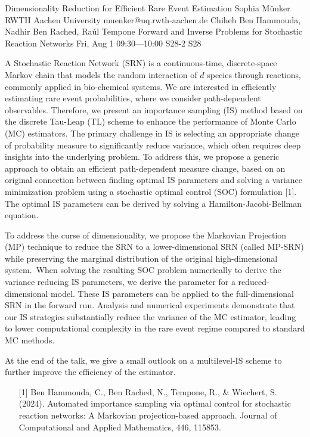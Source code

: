 \begin{talk}
  {Dimensionality Reduction for Efficient Rare Event Estimation}%
  {Sophia M\"unker}%
  {RWTH Aachen University}%
  {muenker@uq.rwth-aachen.de}%
  {Chiheb Ben Hammouda, Nadhir Ben Rached, Ra\'ul Tempone}%
  {Forward and Inverse Problems for Stochastic Reaction Networks}%
  {Fri, Aug 1 09:30---10:00}%
  {S28-2}%
  {S28}%
    
   
A Stochastic Reaction Network (SRN) is a continuous-time, discrete-space Markov chain that models the random interaction of $d$ species through reactions, commonly applied in bio-chemical systems. We are interested in efficiently estimating rare event probabilities, where we consider path-dependent observables. Therefore, we present an importance sampling (IS) method based on the discrete Tau-Leap (TL) scheme to enhance the performance of Monte Carlo (MC) estimators. The primary challenge in IS is selecting an appropriate change of probability measure to significantly reduce variance, which often requires deep insights into the underlying problem. To address this, we propose a generic approach to obtain an efficient path-dependent measure change, based on an original connection between finding optimal IS parameters and solving a variance minimization problem using a stochastic optimal control (SOC) formulation [1]. The optimal IS parameters can be derived by solving a Hamilton-Jacobi-Bellman equation.

To address the curse of dimensionality, we propose the Markovian Projection (MP) technique to reduce the SRN to a lower-dimensional SRN (called MP-SRN) while preserving the marginal distribution of the original high-dimensional system. When solving the resulting SOC problem numerically to derive the variance reducing IS parameters, we derive the parameter for a reduced-dimensional model. These IS parameters can be applied to the full-dimensional SRN in the forward run. Analysis and numerical experiments demonstrate that our IS strategies substantially reduce the variance of the MC estimator, leading to lower computational complexity in the rare event regime compared to standard MC methods. 

At the end of the talk, we give a small outlook on a multilevel-IS scheme to further improve the efficiency of the estimator.


\begin{enumerate}
   \item[{[1]}] Ben Hammouda, C., Ben Rached, N., Tempone, R., \& Wiechert, S. (2024). Automated importance sampling via optimal control for stochastic reaction networks: A Markovian projection-based approach. Journal of Computational and Applied Mathematics, 446, 115853.
\end{enumerate}

\medskip
\end{talk}

